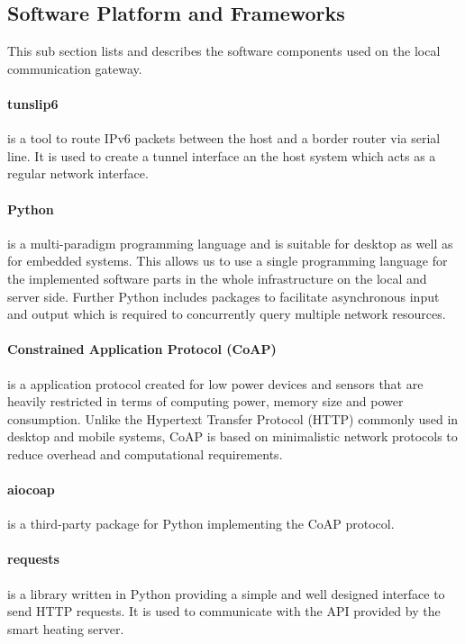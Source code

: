 \subsection{Software Platform and Frameworks}

This sub section lists and describes the software components used on the local communication gateway.

\paragraph{tunslip6} is a tool to route IPv6 packets between the host and a border router via serial line.
It is used to create a tunnel interface an the host system which acts as a regular network interface.

\paragraph{Python} is a multi-paradigm programming language and is suitable for desktop as well as for embedded systems.
This allows us to use a single programming language for the implemented software parts in the whole infrastructure on the local and server side.
Further Python includes packages to facilitate asynchronous input and output which is required to concurrently query multiple network resources.

\paragraph{Constrained Application Protocol (CoAP)} \cite{rfc7252} is a application protocol created for low power devices and sensors that are heavily restricted in terms of computing power, memory size and power consumption.
Unlike the Hypertext Transfer Protocol (HTTP) commonly used in desktop and mobile systems, CoAP is based on minimalistic network protocols to reduce overhead and computational requirements.

\paragraph{aiocoap} is a third-party package for Python implementing the CoAP protocol.

\paragraph{requests} is a library written in Python providing a simple and well designed interface to send HTTP requests.
It is used to communicate with the API provided by the smart heating server.

